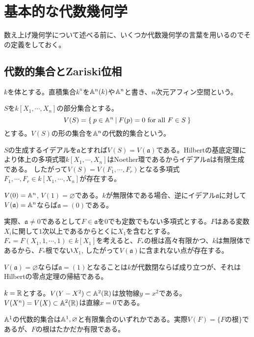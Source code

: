 \documentclass{ltjsreport}
\begin{document}
\section{基本的な代数幾何学}


数え上げ幾何学について述べる前に、いくつか代数幾何学の言葉を用いるのでその定義をしておく。

\subsection{代数的集合とZariski位相}
\begin{defin}
  $k$を体とする。直積集合$k^n$を$\mathbb{A}^n(k)$や$\mathbb{A}^n$と書き、$n$次元アフィン空間という。
\end{defin}

\begin{defin}
  $S$を$k[X_1,\cdots,X_n]$の部分集合とする。
  \[
  V(S)=\left\{\:p\in\mathbb{A}^n\:\middle|\:F(p)=0\text{ for all }F\in S\:\right\}  
  \]
  とする。$V(S)$の形の集合を$\mathbb{A}^n$の代数的集合という。
\end{defin}

$S$の生成するイデアルを$\mathfrak{a}$とすれば$V(S)=V(\mathfrak{a})$である。Hilbertの基底定理により体上の多項式環$k[X_1,\cdots,X_n]$はNoether環であるからイデアル$\mathfrak{a}$は有限生成である。
したがって$V(S)=V(F_1,\cdots,F_r)$となる多項式$F_1,\cdots,F_r\in k[X_1,\cdots,X_n]$が存在する。

\begin{eg}\label{rei1}
  $V(0)=\mathbb{A}^n$, $V(1)=\varnothing$である。$k$が無限体である場合、逆にイデアル$\mathfrak{a}$に対して$V(\mathfrak{a})=\mathbb{A}^n$ならば$\mathfrak{a}=(0)$である。
  
  実際、$\mathfrak{a}\neq 0$であるとして$F\in\mathfrak{a}$を$0$でも定数でもない多項式とする。$F$はある変数$X_i$に関して$1$次以上であるからとくに$X_1$を含むとする。$F_*=F(X_1,1,\cdots,1)\in k[X_1]$を考えると、$F_*$の根は高々有限かつ、$k$は無限体であるから、$F_*$根でない$X_1$, したがって$V(\mathfrak{a})$に含まれない点が存在する。

  $V(\mathfrak{a})=\varnothing$ならば$\mathfrak{a}=(1)$となることは$k$が代数閉ならば成り立つが、それはHilbertの零点定理の帰結である。
\end{eg}

\begin{eg}
  $k=\mathbb{R}$とする。$V(Y-X^2)\subset\mathbb{A}^2(\mathbb{R})$は放物線$y=x^2$である。$V(X^n)=V(X)\subset \mathbb{A}^2(\mathbb{R})$は直線$x=0$である。
\end{eg}

\begin{eg}
  $\mathbb{A}^1$の代数的集合は$\mathbb{A}^1,\varnothing$と有限集合のいずれかである。実際$V(F)=\{\text{$F$の根}\}$であるが、$F$の根はたかだか有限である。
\end{eg}
\end{document}
